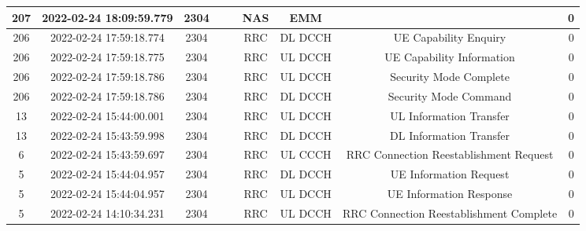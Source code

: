 \begin{longtable*}{|c|c|c|c|c|c|c|c|c|}
207&2022-02-24 18:09:59.779&2304&&&NAS&EMM&&0\\\hline
{}206&2022-02-24 17:59:18.774&2304&&&RRC&DL DCCH&UE Capability Enquiry&0\\\hline
{}206&2022-02-24 17:59:18.775&2304&&&RRC&UL DCCH&UE Capability Information&0\\\hline
{}206&2022-02-24 17:59:18.786&2304&&&RRC&UL DCCH&Security Mode Complete&0\\\hline
{}206&2022-02-24 17:59:18.786&2304&&&RRC&DL DCCH&Security Mode Command&0\\\hline
{}13&2022-02-24 15:44:00.001&2304&&&RRC&UL DCCH&UL Information Transfer&0\\\hline
{}13&2022-02-24 15:43:59.998&2304&&&RRC&DL DCCH&DL Information Transfer&0\\\hline
{}6&2022-02-24 15:43:59.697&2304&&&RRC&UL CCCH&RRC Connection Reestablishment Request&0\\\hline
{}5&2022-02-24 15:44:04.957&2304&&&RRC&DL DCCH&UE Information Request&0\\\hline
{}5&2022-02-24 15:44:04.957&2304&&&RRC&UL DCCH&UE Information Response&0\\\hline
{}5&2022-02-24 14:10:34.231&2304&&&RRC&UL DCCH&RRC Connection Reestablishment Complete&0\\\hline

\end{longtable*}
